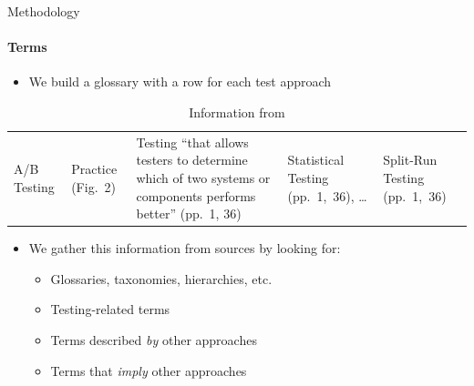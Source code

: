 \begin{frame}{Methodology}
    \framesubtitle{Terms}
    \begin{itemize}
        \item We build a glossary with a row for each test approach
    \end{itemize}
    \begin{center}
        \begin{table}
            \small
            \begin{tabularx}{\linewidth}{|M{1.1cm}|M{1.3cm}|X|M{1.5cm}|M{1.6cm}|}
                \hline
                 &  &                                                                                          &                        &            \\
                \hline
                A/B Testing           & Practice {\tiny (Fig.~2)} & Testing ``that allows testers to determine which of two systems or components performs better'' {\tiny (pp.~1, 36)} & Statistical Testing {\tiny (pp.~1,~36)}, \dots{} & Split-Run Testing {\tiny (pp.~1,~36)} \\
                \hline
            \end{tabularx}
            \caption{\tiny Information from \citep{IEEE2022}}
        \end{table}
    \end{center}
    \vspace{-0.5cm}
    \begin{itemize}
        \item We gather this information from sources by looking for:
              \begin{itemize}
                  \item Glossaries, taxonomies, hierarchies, etc.
                  \item Testing-related terms
                  \item Terms described \emph{by} other approaches
                  \item Terms that \emph{imply} other approaches
              \end{itemize}
    \end{itemize}
\end{frame}

